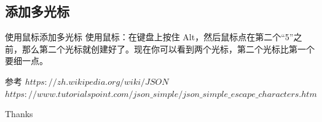 \documentclass{beamer}
\begin{document}
\subsection{添加多光标}
\begin{frame}{使用鼠标添加多光标}
    \centering 使用鼠标：在键盘上按住 Alt，然后鼠标点在第二个“5”之前，那么第二个光标就创建好了。现在你可以看到两个光标，第二个光标比第一个要细一点。
\end{frame}

\begin{frame}{参考}
    \small
    $https://zh.wikipedia.org/wiki/JSON$\\
    $https://www.tutorialspoint.com/json\_simple/json\_simple\_escape\_characters.htm$
\end{frame}

\begin{frame}
    \begin{center}
        {\Huge\calligra Thanks}
    \end{center}
\end{frame}
\end{document}
